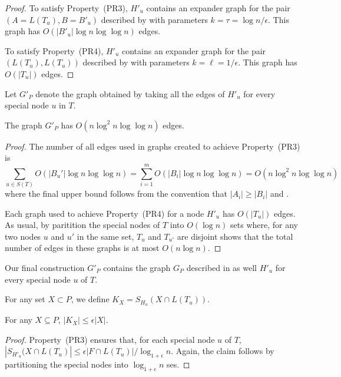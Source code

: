 \documentclass{patmorin}
\begin{document}
\begin{proof}
  To satisfy Property~(PR3), $H'_u$ contains an expander graph for the
  pair $(A=L(T_u),B=B'_u)$ described by  with parameters
  $k=\tau=\log n/\epsilon$.  This graph has $O(|B'_u|\log n\log\log n)$
  edges.

  To satisfy Property~(PR4), $H'_u$ contains an expander graph for the
  pair $(L(T_u),L(T_u))$ described by  with parameters
  $k=\ell=1/\epsilon$.  This graph has $O(|T_u|)$ edges.
\end{proof}

Let $G'_P$ denote the graph obtained by taking all the edges of $H'_u$
for every special node $u$ in $T$.

\begin{clm}
  The graph $G'_P$ has $O(n\log^2 n\log\log n)$ edges.
\end{clm}

\begin{proof}
  The number of all edges used in graphs created to achieve Property~(PR3) is
  \[
      \sum_{u\in S(T)}O(|B_u'|\log n\log\log n)
      = \sum_{i=1}^m O(|B_i|\log n\log\log n)
      = O(n\log^2 n\log\log n)
  \]
  where the final upper bound follows from the convention that $|A_i|\ge |B_i|$
  and .

  Each graph used to achieve Property~(PR4) for a node $H'_u$ has
  $O(|T_u|)$ edges.  As usual, by paritition the special nodes of $T$
  into $O(\log n)$ sets where, for any two nodes $u$ and $u'$ in the
  same set, $T_u$ and $T_{u'}$ are disjoint shows that the total number
  of edges in these graphs is at most $O(n\log n)$.
\end{proof}

Our final construction $G'_P$ contains the graph $G_P$ described in
 as well $H'_u$ for every special node $u$ of $T$.

For any set $X\subset P$, we define $K_{X} = S_{H_u}(X\cap L(T_u))$.

\begin{clm}
  For any $X\subseteq P$, $|K_{X}| \le \epsilon|X|$.
\end{clm}

\begin{proof}
  Property~(PR3) ensures that, for each special node $u$ of $T$,
  $|S_{H'_u}(X\cap L(T_u)| \le \epsilon|F\cap L(T_u)|/\log_{1+\epsilon}
  n$.  Again, the claim follows by partitioning the special nodes into
  $\log_{1+\epsilon} n$ ses.
\end{proof}
\end{document}
